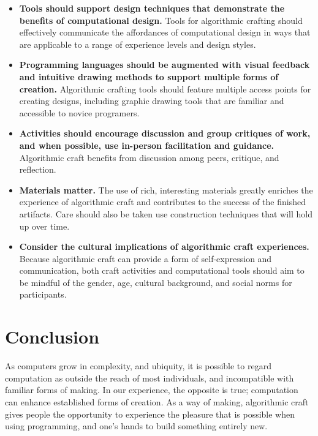 \documentclass{sigchi}
\begin{document}
\begin{itemize}
\item \textbf{Tools should support design techniques that demonstrate the benefits of computational design.} Tools for algorithmic crafting should effectively communicate the affordances of computational design in ways that are applicable to a range of experience levels and design styles.

\item \textbf{Programming languages should be augmented with visual feedback and intuitive drawing methods to support multiple forms of creation.} Algorithmic crafting tools should feature multiple access points for creating designs, including graphic drawing tools that are familiar and accessible to novice programers.

\item \textbf{Activities should encourage discussion and group critiques of work, and when possible, use in-person facilitation and guidance.} Algorithmic craft benefits from discussion among peers, critique, and reflection.

\item \textbf{Materials matter.} The use of rich, interesting materials greatly enriches the experience of algorithmic craft and contributes to the success of the finished artifacts. Care should also be taken use construction techniques that will hold up over time.

\item \textbf{Consider the cultural implications of algorithmic craft experiences.} Because algorithmic craft can provide a form of self-expression and communication, both craft activities and computational tools should aim to be mindful of the gender, age, cultural background, and social norms for participants.
\end{itemize}

\section{Conclusion}
As computers grow in complexity, and ubiquity, it is possible to regard computation as outside the reach of most individuals, and incompatible with familiar forms of making. In our experience, the opposite is true; computation can enhance established forms of creation. As a way of making, algorithmic craft gives people the opportunity to experience the pleasure that is possible when using programming, and one's hands to build something entirely new. 
\balance




\end{document}
